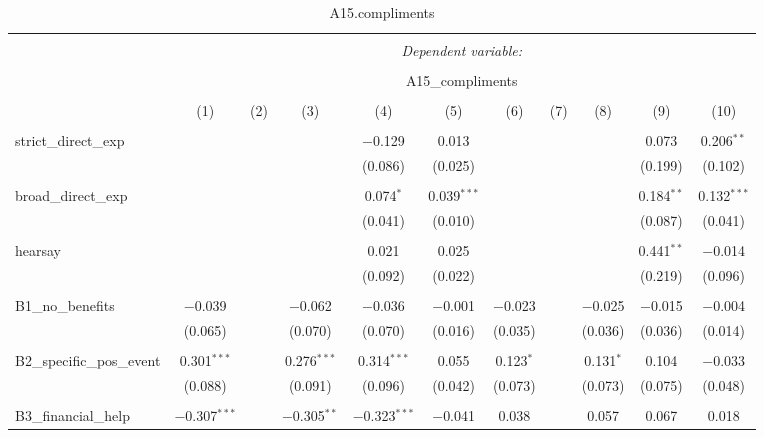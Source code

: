 
\begin{table}[H] \centering 
  \caption{A15.compliments} 
  \label{} 
\tiny 
\begin{tabular}{@{\extracolsep{4pt}}lcccccccccc} 
\\[-1.8ex]\hline 
\hline \\[-1.8ex] 
 & \multicolumn{10}{c}{\textit{Dependent variable:}} \\ 
\cline{2-11} 
\\[-1.8ex] & \multicolumn{10}{c}{A15\_compliments} \\ 
\\[-1.8ex] & (1) & (2) & (3) & (4) & (5) & (6) & (7) & (8) & (9) & (10)\\ 
\hline \\[-1.8ex] 
 strict\_direct\_exp &  &  &  & $-$0.129 & 0.013 &  &  &  & 0.073 & 0.206$^{**}$ \\ 
  &  &  &  & (0.086) & (0.025) &  &  &  & (0.199) & (0.102) \\ 
  & & & & & & & & & & \\ 
 broad\_direct\_exp &  &  &  & 0.074$^{*}$ & 0.039$^{***}$ &  &  &  & 0.184$^{**}$ & 0.132$^{***}$ \\ 
  &  &  &  & (0.041) & (0.010) &  &  &  & (0.087) & (0.041) \\ 
  & & & & & & & & & & \\ 
 hearsay &  &  &  & 0.021 & 0.025 &  &  &  & 0.441$^{**}$ & $-$0.014 \\ 
  &  &  &  & (0.092) & (0.022) &  &  &  & (0.219) & (0.096) \\ 
  & & & & & & & & & & \\ 
 B1\_no\_benefits & $-$0.039 &  & $-$0.062 & $-$0.036 & $-$0.001 & $-$0.023 &  & $-$0.025 & $-$0.015 & $-$0.004 \\ 
  & (0.065) &  & (0.070) & (0.070) & (0.016) & (0.035) &  & (0.036) & (0.036) & (0.014) \\ 
  & & & & & & & & & & \\ 
 B2\_specific\_pos\_event & 0.301$^{***}$ &  & 0.276$^{***}$ & 0.314$^{***}$ & 0.055 & 0.123$^{*}$ &  & 0.131$^{*}$ & 0.104 & $-$0.033 \\ 
  & (0.088) &  & (0.091) & (0.096) & (0.042) & (0.073) &  & (0.073) & (0.075) & (0.048) \\ 
  & & & & & & & & & & \\ 
 B3\_financial\_help & $-$0.307$^{***}$ &  & $-$0.305$^{**}$ & $-$0.323$^{***}$ & $-$0.041 & 0.038 &  & 0.057 & 0.067 & 0.018 \\ 

\end{tabular}
\end{table}

